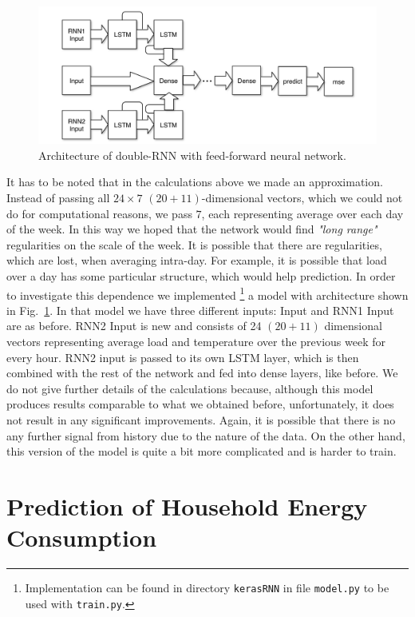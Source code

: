 \documentclass{article} %
\begin{document}
\begin{figure}[h]
\begin{center}
\includegraphics[width=0.70\linewidth]{energy_RNN2_diag.pdf}	
\end{center}
\caption{Architecture of double-RNN with feed-forward neural network.}
\label{fig:energy/rnn2_diag}
\end{figure}
It has to be noted that in the calculations above we made an approximation.
Instead of passing all $24\times7$ $(20+11)$-dimensional vectors,
which we could not do for computational reasons,
we  pass $7$, each representing average over each day of the week.
In this way we hoped that the network would find {\it "long range"}
regularities on the scale of the week. It is possible that there are
regularities, which are lost, when averaging intra-day. For example,
it is possible that load over a day has some particular structure,
which would help prediction.
In order to investigate this dependence we implemented%
\footnote{
Implementation can be found in directory {\tt kerasRNN} in file
{\tt model.py} to be used with {\tt train.py}.
}
a model with architecture shown in Fig.~\ref{fig:energy/rnn2_diag}.
In that model we have three different inputs: Input and RNN1 Input
are as before. RNN2 Input is new and consists of 24 $(20+11)$ dimensional 
vectors representing average load and temperature over the previous week 
for every hour. RNN2 input is passed to its own LSTM layer, which is 
then combined with the rest of the network and fed into dense layers,
like before.
We do not give further details of the calculations because, although
this model produces results comparable to what we obtained before, 
unfortunately, it does not result in any significant improvements.
Again, it is possible that there is no any further signal from history
due to the nature of the data. On the other hand, this version of the model
is quite a bit more complicated and is harder to train.




\section{Prediction of Household Energy Consumption}
\label{sec:house}
\end{document}
